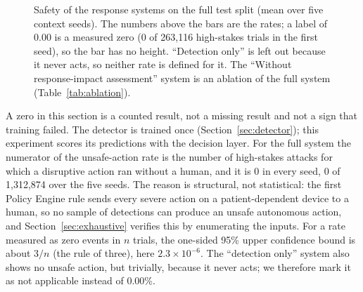\documentclass[preprint,12pt]{elsarticle}
\begin{document}
\begin{figure}[htbp]
\centering
{}
\caption{Safety of the response systems on the full test split (mean over five context seeds). The numbers above the bars are the rates; a label of 0.00 is a measured zero (0 of 263,116 high-stakes trials in the first seed), so the bar has no height. ``Detection only'' is left out because it never acts, so neither rate is defined for it. The ``Without response-impact assessment'' system is an ablation of the full system (Table~\ref{tab:ablation}).}
\label{fig:systems}
\end{figure}

A zero in this section is a counted result, not a missing result and not a sign that training failed. The detector is trained once (Section~\ref{sec:detector}); this experiment scores its predictions with the decision layer. For the full system the numerator of the unsafe-action rate is the number of high-stakes attacks for which a disruptive action ran without a human, and it is 0 in every seed, 0 of 1,312,874 over the five seeds. The reason is structural, not statistical: the first Policy Engine rule sends every severe action on a patient-dependent device to a human, so no sample of detections can produce an unsafe autonomous action, and Section~\ref{sec:exhaustive} verifies this by enumerating the inputs. For a rate measured as zero events in $n$ trials, the one-sided 95\% upper confidence bound is about $3/n$ (the rule of three), here $2.3\times10^{-6}$. The ``detection only'' system also shows no unsafe action, but trivially, because it never acts; we therefore mark it as not applicable instead of 0.00\%.
\end{document}
